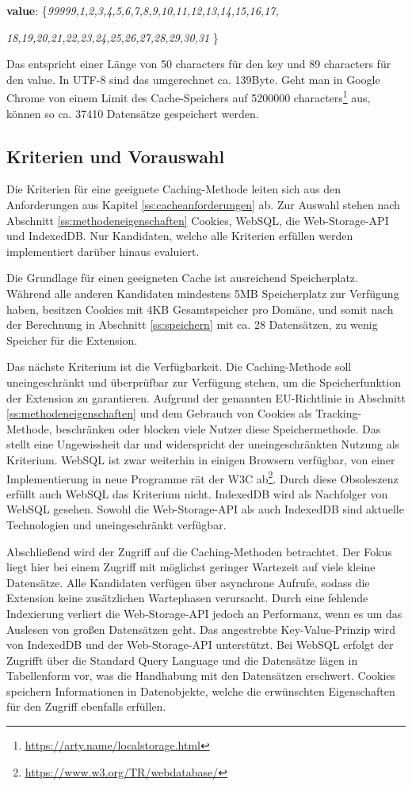 \textbf{value}: \big\{\textit{99999,1,2,3,4,5,6,7,8,9,10,11,12,13,14,15,16,17,}
	
\textit{18,19,20,21,22,23,24,25,26,27,28,29,30,31} \big\}

Das entspricht einer Länge von 50 characters für den key und 89 characters für den value. In UTF-8 sind das umgerechnet ca. 139Byte. Geht man in Google Chrome von einem Limit des Cache-Speichers auf 5200000 characters\footnote{\url{https://arty.name/localstorage.html}} aus, können so ca. 37410 Datensätze gespeichert werden.

\subsection{Kriterien und Vorauswahl}
\label{vorauswahl}

Die Kriterien für eine geeignete Caching-Methode leiten sich aus den Anforderungen aus Kapitel \ref{ss:cacheanforderungen} ab. Zur Auswahl stehen nach Abschnitt \ref{ss:methodeneigenschaften} Cookies, WebSQL, die Web-Storage-API und IndexedDB. Nur Kandidaten, welche alle Kriterien erfüllen werden implementiert darüber hinaus evaluiert.

Die Grundlage für einen geeigneten Cache ist ausreichend Speicherplatz. Während alle anderen Kandidaten mindestens 5MB Speicherplatz zur Verfügung haben, besitzen Cookies mit 4KB Gesamtspeicher pro Domäne, und somit nach der Berechnung in Abschnitt \ref{ss:speichern} mit ca. 28 Datensätzen, zu wenig Speicher für die Extension. 

Das nächste Kriterium ist die Verfügbarkeit. Die Caching-Methode soll uneingeschränkt und überprüfbar zur Verfügung stehen, um die Speicherfunktion der Extension zu garantieren. Aufgrund der genannten EU-Richtlinie in Abschnitt \ref{ss:methodeneigenschaften} und dem Gebrauch von Cookies als Tracking-Methode, beschränken oder blocken viele Nutzer diese Speichermethode. Das stellt eine Ungewissheit dar und widerspricht der uneingeschränkten Nutzung als Kriterium.
WebSQL ist zwar weiterhin in einigen Browsern verfügbar, von einer Implementierung in neue Programme rät der W3C ab\footnote{\url{https://www.w3.org/TR/webdatabase/}}. Durch diese Obsoleszenz erfüllt auch WebSQL das Kriterium nicht. IndexedDB wird als Nachfolger von WebSQL gesehen. Sowohl die Web-Storage-API als auch IndexedDB sind aktuelle Technologien und uneingeschränkt verfügbar.

Abschließend wird der Zugriff auf die Caching-Methoden betrachtet. Der Fokus liegt hier bei einem Zugriff mit möglichst geringer Wartezeit auf viele kleine Datensätze. Alle Kandidaten verfügen über asynchrone Aufrufe, sodass die Extension keine zusätzlichen Wartephasen verursacht. Durch eine fehlende Indexierung verliert die Web-Storage-API jedoch an Performanz, wenn es um das Auslesen von großen Datensätzen geht. Das angestrebte Key-Value-Prinzip wird von IndexedDB und der Web-Storage-API unterstützt. Bei WebSQL erfolgt der Zugrifft über die \glqq Standard Query Language \grqq{} und die Datensätze lägen in Tabellenform vor, was die Handhabung mit den Datensätzen erschwert. Cookies speichern Informationen in Datenobjekte, welche die erwünschten Eigenschaften für den Zugriff ebenfalls erfüllen.

